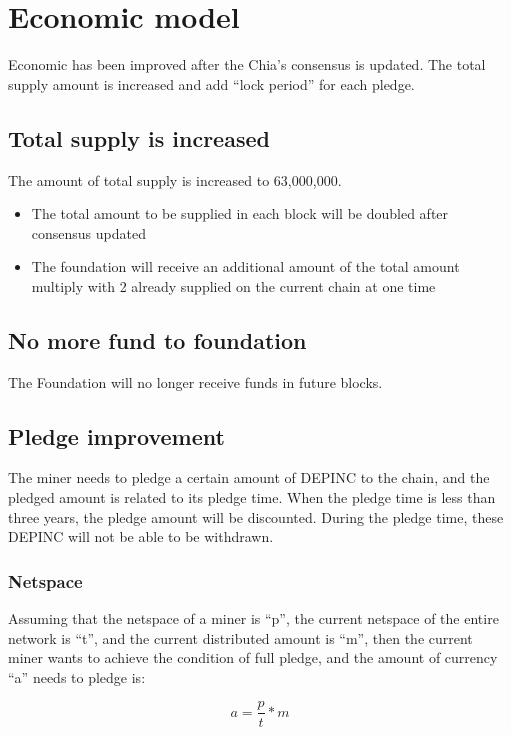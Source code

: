 \section{Economic model}
\begin{flushleft}
    Economic has been improved after the Chia's consensus is updated. The total supply amount is increased and add ``lock period'' for each pledge.
\end{flushleft}
\subsection{Total supply is increased}
\begin{flushleft}
    The amount of total supply is increased to 63,000,000.
\end{flushleft}
\begin{itemize}
    \item The total amount to be supplied in each block will be doubled after consensus updated
    \item The foundation will receive an additional amount of the total amount multiply with 2 already supplied on the current chain at one time
\end{itemize}
\subsection{No more fund to foundation}
\begin{flushleft}
    The Foundation will no longer receive funds in future blocks.
\end{flushleft}
\subsection{Pledge improvement}
\begin{flushleft}
    The miner needs to pledge a certain amount of DEPINC to the chain, and the pledged amount is related to its pledge time. When the pledge time is less than three years, the pledge amount will be discounted. During the pledge time, these DEPINC will not be able to be withdrawn.
\end{flushleft}
\subsubsection{Netspace}
\begin{flushleft}
    Assuming that the netspace of a miner is ``p'', the current netspace of the entire network is ``t'', and the current distributed amount is ``m'', then the current miner wants to achieve the condition of full pledge, and the amount of currency ``a'' needs to pledge is:
\end{flushleft}
\begin{equation}
    a = \frac{p}{t} * m
\end{equation}
